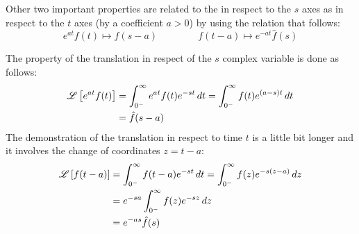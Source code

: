 	Other two important properties are related to the  in respect to the $s$ axes as in respect to the $t$ axes (by a coefficient $a>0$) by using the relation that follows:
	\begin{equation}
		e^{at} f(t) \mapsto \hat f(s-a) \qquad \, \qquad f(t-a) \mapsto e^{-at} \hat f(s)
	\end{equation}

	\begin{demonstration}
		The property of the translation in respect of the $s$ complex variable is done as follows:
		\begin{align*}
			\mathscr{L} \left[ e^{at}f(t) \right] & = \int_{0^-}^\infty e^{at} f(t) e^{-st} \, dt = \int_{0^-}^\infty f(t) e^{(a-s)t} \, dt \\ & = \hat f(s-a)
		\end{align*}
		The demonstration of the translation in respect to time $t$ is a little bit longer and it involves the change of coordinates $z = t-a$:
		\begin{align*}
			\mathscr{L} \left[ f(t-a) \right] & = \int_{0^-}^\infty f(t-a) e^{-st} \, dt = \int_{0^-}^\infty f(z) e^{-s(z-a)} \, dz \\ 
			& = e^{-sa} \int_{0^-}^\infty f(z) e^{-sz}\, dz \\ & = e^{-as} \hat f(s)
 		\end{align*} 
	\end{demonstration}
	
